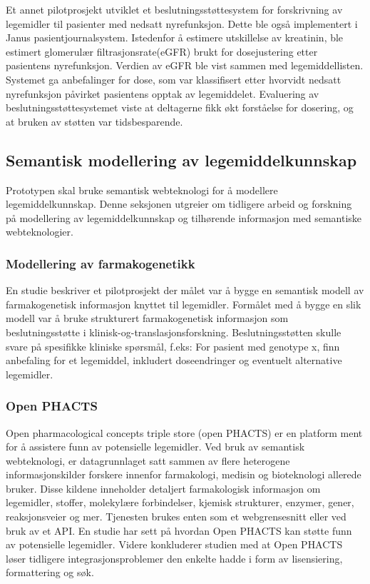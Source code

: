 Et annet pilotprosjekt utviklet et beslutningsstøttesystem for forskrivning av legemidler til pasienter med nedsatt nyrefunksjon\citep{Shemeikka_Bastholm-Rahmner_2015}. Dette ble også implementert i Janus pasientjournalsystem. Istedenfor å estimere utskillelse av kreatinin, ble estimert glomerulær filtrasjonsrate(eGFR) brukt for dosejustering etter pasientens nyrefunksjon. Verdien av eGFR ble vist sammen med legemiddellisten. Systemet ga anbefalinger for dose, som var klassifisert etter hvorvidt nedsatt nyrefunksjon påvirket pasientens opptak av legemiddelet. Evaluering av beslutningsstøttesystemet viste at deltagerne fikk økt forståelse for dosering, og at bruken av støtten var tidsbesparende.   

\subsection{Semantisk modellering av legemiddelkunnskap}
Prototypen skal bruke semantisk webteknologi for å modellere legemiddelkunnskap. Denne seksjonen utgreier om tidligere arbeid og forskning på modellering av legemiddelkunnskap og tilhørende informasjon med semantiske webteknologier.

\subsubsection{Modellering av farmakogenetikk}
En studie beskriver et pilotprosjekt der målet var å bygge en semantisk modell av farmakogenetisk informasjon knyttet til legemidler\citep{Boyce_Freimuth_2013}. Formålet med å bygge en slik modell var å bruke strukturert farmakogenetisk informasjon som beslutningsstøtte i klinisk-og-translasjonsforskning. Beslutningsstøtten skulle svare på spesifikke kliniske spørsmål, f.eks: For pasient med genotype x, finn anbefaling for et legemiddel, inkludert doseendringer og eventuelt alternative legemidler. 

\subsubsection{Open PHACTS}
Open pharmacological concepts triple store (open PHACTS) er en platform ment for å assistere funn av potensielle legemidler. Ved bruk av semantisk webteknologi, er datagrunnlaget satt sammen av flere heterogene informasjonskilder forskere innenfor farmakologi, medisin og bioteknologi allerede bruker. Disse kildene inneholder detaljert farmakologisk informasjon om legemidler, stoffer, molekylære forbindelser, kjemisk strukturer, enzymer, gener, reaksjonsveier og mer. Tjenesten brukes enten som et webgrensesnitt eller ved bruk av et API\citep{open_phacts_explorer}. En studie har sett på hvordan Open PHACTS kan støtte funn av potensielle legemidler\citep{Ratnam_2014}. Videre konkluderer studien med at Open PHACTS løser tidligere integrasjonsproblemer den enkelte hadde i form av lisensiering, formattering og søk.

